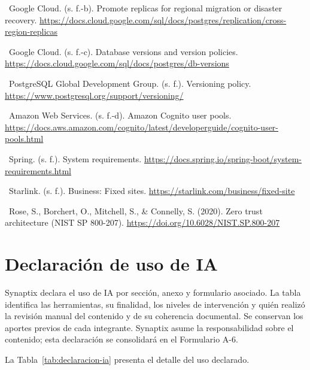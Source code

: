 \documentclass[11pt,letterpaper]{report}
\begin{document}
\noindent\textbullet\ Google Cloud. (s. f.-b). Promote replicas for regional migration or disaster recovery. \url{https://docs.cloud.google.com/sql/docs/postgres/replication/cross-region-replicas}\par
\noindent\textbullet\ Google Cloud. (s. f.-c). Database versions and version policies. \url{https://docs.cloud.google.com/sql/docs/postgres/db-versions}\par
\noindent\textbullet\ PostgreSQL Global Development Group. (s. f.). Versioning policy. \url{https://www.postgresql.org/support/versioning/}\par
\noindent\textbullet\ Amazon Web Services. (s. f.-d). Amazon Cognito user pools. \url{https://docs.aws.amazon.com/cognito/latest/developerguide/cognito-user-pools.html}\par
\noindent\textbullet\ Spring. (s. f.). System requirements. \url{https://docs.spring.io/spring-boot/system-requirements.html}\par
\noindent\textbullet\ Starlink. (s. f.). Business: Fixed sites. \url{https://starlink.com/business/fixed-site}\par
\noindent\textbullet\ Rose, S., Borchert, O., Mitchell, S., \& Connelly, S. (2020). Zero trust architecture (NIST SP 800-207). \url{https://doi.org/10.6028/NIST.SP.800-207}\par
\section*{Declaración de uso de IA}
Synaptix declara el uso de IA por sección, anexo y formulario asociado. La tabla identifica las herramientas, su finalidad, los niveles de intervención y quién realizó la revisión manual del contenido y de su coherencia documental. Se conservan los aportes previos de cada integrante. Synaptix asume la responsabilidad sobre el contenido; esta declaración se consolidará en el Formulario A-6.

La Tabla~\ref{tab:declaracion-ia} presenta el detalle del uso declarado.
\begin{declaracionia}
\DeclaracionesIA
\end{declaracionia}
\end{document}
